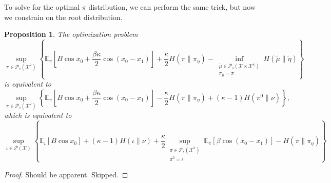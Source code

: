 \documentclass[12pt]{article}
\newtheorem{proposition}[theorem]{Proposition}
\numberwithin{equation}{section}
\begin{document}
To solve for the optimal $\pi$ distribution, we can perform the same trick, but now we constrain on the root distribution.

\begin{proposition}
    The optimization problem
    \begin{equation*}
        \sup_{\pi\in\mathcal{P}_s(\mathcal{X}^2)}\left\{\mathbb{E}_\pi\left[B\cos x_0 + \frac{\beta\kappa}2\cos(x_0-x_1)\right] + \frac\kappa2
        H(\pi\|\pi_\eta) - \inf_{\substack{\widetilde\mu\in\mathcal{P}_{s}(\mathcal{X}\times\mathcal{X}^\kappa) \\ \pi_{\widetilde\mu}=\pi}} H(\widetilde\mu\|\widetilde\eta)\right\}
    \end{equation*}
    is equivalent to
    \begin{equation*}
        \sup_{\pi\in\mathcal{P}_s(\mathcal{X}^2)}\left\{\mathbb{E}_\pi\left[B\cos x_0 + \frac{\beta\kappa}2\cos(x_0-x_1)\right] - \frac\kappa2
        H(\pi\|\pi_\eta) + (\kappa-1)H(\pi^0 \| \nu)\right\},
    \end{equation*}
    which is equivalent to
    \begin{equation*}
        \sup_{\iota\in\mathcal{P}(\mathcal{X})}\left\{\mathbb{E}_{\iota}\left[B\cos x_0\right] + (\kappa-1)H(\iota \| \nu) +
        \frac\kappa2\sup_{\substack{\pi\in\mathcal{P}_s(\mathcal{X}^2)\\ \pi^0=\iota}}\mathbb{E}_{\pi}[\beta\cos(x_0-x_1)] - H(\pi\|\pi_\eta)\right\}
    \end{equation*}
\end{proposition}

\begin{proof}
    Should be apparent. Skipped.
\end{proof}
\end{document}
